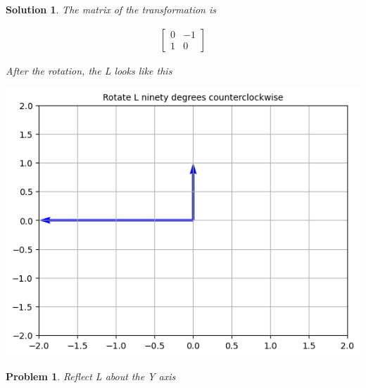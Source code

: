 \documentclass{article}
\newtheorem{problem}{Problem}
\newtheorem*{solution}{Solution}
\begin{document}
\begin{solution}
The matrix of the transformation is 

\begin{align*}
\begin{bmatrix}
0 & -1 \\ 
1 & 0
\end{bmatrix}
\end{align*}

After the rotation, the L looks like this

\includegraphics[scale=0.5, center]{Lrot90} 

\end{solution}

\begin{problem}
Reflect L about the Y axis
\end{problem}
\end{document}
